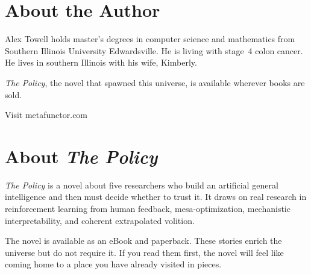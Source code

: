 \documentclass[11pt,twoside]{book}
\begin{document}
\clearpage

\chapter*{About the Author}

Alex Towell holds master's degrees in computer science and mathematics from Southern Illinois University Edwardsville. He is living with stage~4 colon cancer. He lives in southern Illinois with his wife, Kimberly.

\medskip

\noindent \textit{The Policy}, the novel that spawned this universe, is available wherever books are sold.

\medskip

\noindent Visit metafunctor.com

\clearpage

\chapter*{About \textit{The Policy}}

\textit{The Policy} is a novel about five researchers who build an artificial general intelligence and then must decide whether to trust it. It draws on real research in reinforcement learning from human feedback, mesa-optimization, mechanistic interpretability, and coherent extrapolated volition.

The novel is available as an eBook and paperback. These stories enrich the universe but do not require it. If you read them first, the novel will feel like coming home to a place you have already visited in pieces.
\end{document}
